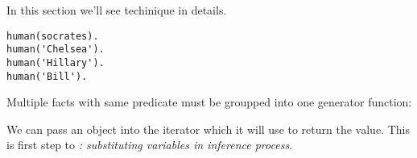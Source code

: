 \label{yield}

In this section we'll see \href{http://yieldprolog.sourceforge.net/}{\yp}
techinique in details.

\begin{verbatim}
human(socrates).
human('Chelsea').
human('Hillary').
human('Bill').
\end{verbatim}

Multiple facts with same predicate must be groupped into one generator function: 



We can pass an object into the iterator which it will use to return the value.
This is first step to \emph{: substituting variables in
inference process}.


